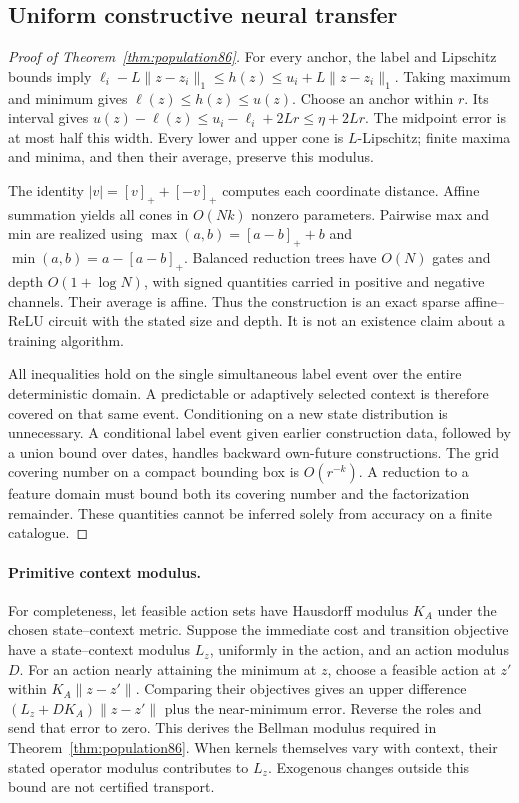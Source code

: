 \subsection{Uniform constructive neural transfer}
\begin{proof}[Proof of Theorem~\ref{thm:population86}]
For every anchor, the label and Lipschitz bounds imply
$\ell_i-L\|z-z_i\|_1\le h(z)\le u_i+L\|z-z_i\|_1$.
Taking maximum and minimum gives $\ell(z)\le h(z)\le u(z)$. Choose an anchor within $r$. Its interval gives
$u(z)-\ell(z)\le u_i-\ell_i+2Lr\le\eta+2Lr$.
The midpoint error is at most half this width. Every lower and upper cone is $L$-Lipschitz; finite maxima and minima, and then their average, preserve this modulus.

The identity $|v|=[v]_++[-v]_+$ computes each coordinate distance. Affine summation yields all cones in $O(Nk)$ nonzero parameters. Pairwise max and min are realized using $\max(a,b)=[a-b]_++b$ and $\min(a,b)=a-[a-b]_+$. Balanced reduction trees have $O(N)$ gates and depth $O(1+\log N)$, with signed quantities carried in positive and negative channels. Their average is affine. Thus the construction is an exact sparse affine--ReLU circuit with the stated size and depth. It is not an existence claim about a training algorithm.

All inequalities hold on the single simultaneous label event over the entire deterministic domain. A predictable or adaptively selected context is therefore covered on that same event. Conditioning on a new state distribution is unnecessary. A conditional label event given earlier construction data, followed by a union bound over dates, handles backward own-future constructions. The grid covering number on a compact bounding box is $O(r^{-k})$. A reduction to a feature domain must bound both its covering number and the factorization remainder. These quantities cannot be inferred solely from accuracy on a finite catalogue.
\end{proof}

\paragraph{Primitive context modulus.}
For completeness, let feasible action sets have Hausdorff modulus $K_A$ under the chosen state--context metric. Suppose the immediate cost and transition objective have a state--context modulus $L_z$, uniformly in the action, and an action modulus $D$. For an action nearly attaining the minimum at $z$, choose a feasible action at $z'$ within $K_A\|z-z'\|$. Comparing their objectives gives an upper difference $(L_z+DK_A)\|z-z'\|$ plus the near-minimum error. Reverse the roles and send that error to zero. This derives the Bellman modulus required in Theorem~\ref{thm:population86}. When kernels themselves vary with context, their stated operator modulus contributes to $L_z$. Exogenous changes outside this bound are not certified transport.

